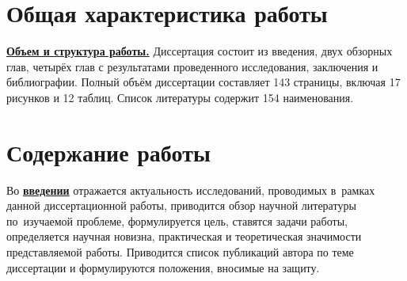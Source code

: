 \section*{Общая характеристика работы}

\newcommand{\actuality}{\pdfbookmark[1]{Актуальность}{actuality}\underline{\textbf{\actualityTXT}}}
\newcommand{\progress}{\pdfbookmark[1]{Разработанность темы}{progress}\underline{\textbf{\progressTXT}}}
\newcommand{\aim}{\pdfbookmark[1]{Цели}{aim}\underline{{\textbf\aimTXT}}}
\newcommand{\tasks}{\pdfbookmark[1]{Задачи}{tasks}\underline{\textbf{\tasksTXT}}}
\newcommand{\aimtasks}{\pdfbookmark[1]{Цели и задачи}{aimtasks}\aimtasksTXT}
\newcommand{\novelty}{\pdfbookmark[1]{Научная новизна}{novelty}\underline{\textbf{\noveltyTXT}}}
\newcommand{\influence}{\pdfbookmark[1]{Практическая значимость}{influence}\underline{\textbf{\influenceTXT}}}
\newcommand{\methods}{\pdfbookmark[1]{Методология и методы исследования}{methods}\underline{\textbf{\methodsTXT}}}
\newcommand{\defpositions}{\pdfbookmark[1]{Положения, выносимые на защиту}{defpositions}\underline{\textbf{\defpositionsTXT}}}
\newcommand{\reliability}{\pdfbookmark[1]{Достоверность}{reliability}\underline{\textbf{\reliabilityTXT}}}
\newcommand{\probation}{\pdfbookmark[1]{Апробация}{probation}\underline{\textbf{\probationTXT}}}
\newcommand{\contribution}{\pdfbookmark[1]{Личный вклад}{contribution}\underline{\textbf{\contributionTXT}}}
\newcommand{\publications}{\pdfbookmark[1]{Публикации}{publications}\underline{\textbf{\publicationsTXT}}}



\underline{\textbf{Объем и структура работы.}} Диссертация состоит из введения, двух обзорных глав, четырёх глав с результатами проведенного исследования, заключения и библиографии. Полный объём диссертации составляет 143 страницы, включая 17 рисунков и 12 таблиц. Список литературы содержит 154 наименования.

\section*{Содержание работы}
Во \underline{\textbf{введении}} отражается актуальность
исследований, проводимых в~рамках данной диссертационной работы,
приводится обзор научной литературы по~изучаемой проблеме,
формулируется цель, ставятся задачи работы, определяется научная новизна, практическая и теоретическая значимости представляемой работы. Приводится список публикаций автора по теме диссертации и формулируются положения, вносимые на защиту.

